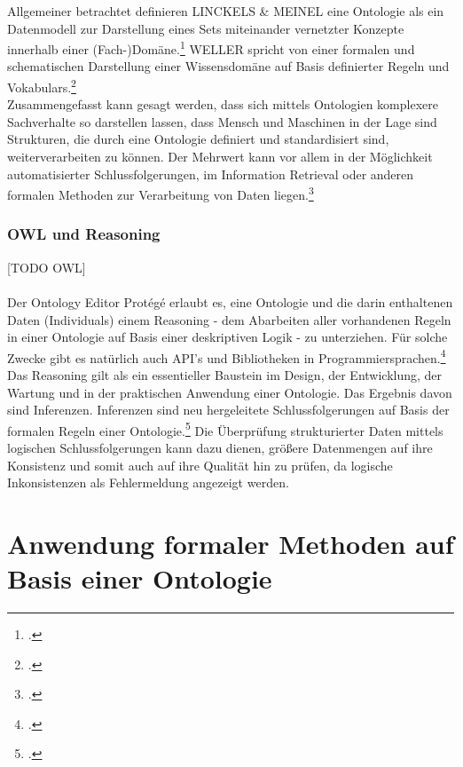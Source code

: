 \documentclass[12pt,a4paper]{article}
\begin{document}
Allgemeiner betrachtet definieren LINCKELS \& MEINEL eine Ontologie als ein Datenmodell zur Darstellung eines Sets miteinander vernetzter Konzepte innerhalb einer (Fach-)Domäne.\footcite{linckels2011librarian} WELLER spricht von einer formalen und schematischen Darstellung einer Wissensdomäne auf Basis definierter Regeln und Vokabulars.\footcite{weller2013InformationBand}
\\ 
Zusammengefasst kann gesagt werden, dass sich mittels Ontologien komplexere Sachverhalte so darstellen lassen, dass Mensch und Maschinen in der Lage sind Strukturen, die durch eine Ontologie definiert und standardisiert sind, weiterverarbeiten zu können. Der Mehrwert kann vor allem in der Möglichkeit automatisierter Schlussfolgerungen, im Information Retrieval oder anderen formalen Methoden zur Verarbeitung von Daten liegen.\footcite[][S.162-178]{jannidis2017digital} 

\subsubsection{OWL und Reasoning}

[TODO OWL]
\\
\\
Der Ontology Editor Protégé erlaubt es, eine Ontologie und die darin enthaltenen Daten (Individuals) einem Reasoning - dem Abarbeiten aller vorhandenen Regeln in einer Ontologie auf Basis einer deskriptiven Logik - zu unterziehen. Für solche Zwecke gibt es natürlich auch API's und Bibliotheken in Programmiersprachen.\footcite{musen2015protege} Das Reasoning gilt als ein essentieller Baustein im Design, der Entwicklung, der Wartung und in der praktischen Anwendung einer Ontologie. Das Ergebnis davon sind Inferenzen. Inferenzen sind neu hergeleitete Schlussfolgerungen auf Basis der formalen Regeln einer Ontologie.\footcite{dentler2011comparison} Die Überprüfung strukturierter Daten mittels logischen Schlussfolgerungen kann dazu dienen, größere Datenmengen auf ihre Konsistenz und somit auch auf ihre Qualität hin zu prüfen, da logische Inkonsistenzen als Fehlermeldung angezeigt werden.

\newpage
\section{Anwendung formaler Methoden auf Basis einer Ontologie}
\label{Umsetzung}
\end{document}
